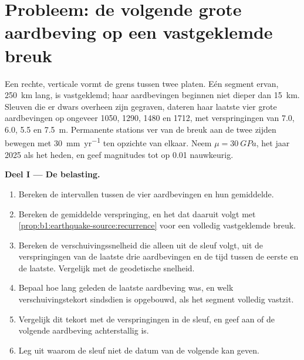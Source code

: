 \section{Probleem: de volgende grote aardbeving op een vastgeklemde breuk}

\begin{problem}
\label{pb:b1:earthquake-source:1}
Een rechte, verticale  vormt de grens tussen twee platen. Eén segment ervan, \qty{250}{km} lang, is vastgeklemd; haar aardbevingen beginnen niet dieper dan \qty{15}{km}. Sleuven die er dwars overheen zijn gegraven, dateren haar laatste vier grote aardbevingen op ongeveer 1050, 1290, 1480 en 1712, met verspringingen van \num{7.0}, \num{6.0}, \num{5.5} en \qty{7.5}{m}. Permanente stations ver van de breuk aan de twee zijden bewegen met \qty{30}{mm.yr^{-1}} ten opzichte van elkaar. Neem $\mu =
\qty{30}{GPa}$, het jaar 2025 als het heden, en geef magnitudes tot op 0.01 nauwkeurig.

\medskip
\noindent\textbf{Deel I --- De belasting.}
\begin{enumerate}
  \item Bereken de intervallen tussen de vier aardbevingen en hun gemiddelde.
  \item Bereken de gemiddelde verspringing, en het  dat daaruit volgt met \cref{prop:b1:earthquake-source:recurrence} voor een volledig vastgeklemde breuk.
  \item Bereken de verschuivingssnelheid die alleen uit de sleuf volgt, uit de verspringingen van de laatste drie aardbevingen en de tijd tussen de eerste en de laatste. Vergelijk met de geodetische snelheid.
  \item Bepaal hoe lang geleden de laatste aardbeving was, en welk verschuivingstekort sindsdien is opgebouwd, als het segment volledig vastzit.
  \item Vergelijk dit tekort met de verspringingen in de sleuf, en geef aan of de volgende aardbeving achterstallig is.
  \item Leg uit waarom de sleuf niet de datum van de volgende kan geven.
\end{enumerate}


\end{problem}
